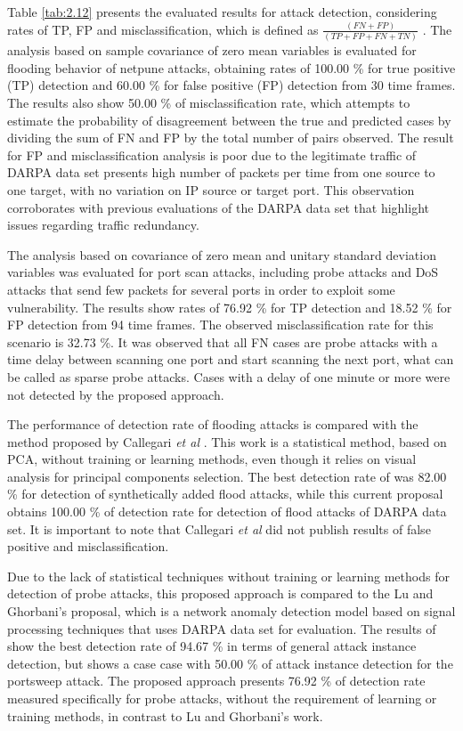 Table \ref{tab:2.12} presents the evaluated results for attack detection, considering rates of TP, FP \cite{fleiss2013statistical} and misclassification, which is defined as $\frac{(FN+FP)}{(TP+FP+FN+TN)}$ \cite{bhuyan2014network}. The analysis based on sample covariance of zero mean variables is evaluated for flooding behavior of netpune attacks, obtaining rates of 100.00 \% for true positive (TP) detection and 60.00 \% for false positive (FP) detection from 30 time frames. The results also show 50.00 \% of misclassification rate, which attempts to estimate the probability of disagreement between the true and predicted cases by dividing the sum of FN and FP by the total number of pairs observed. The result for FP and misclassification analysis is poor due to the legitimate traffic of DARPA data set presents high number of packets per time from one source to one target, with no variation on IP source or target port. This observation corroborates with previous evaluations of the DARPA data set that highlight issues regarding traffic redundancy. 

The analysis based on covariance of zero mean and unitary standard deviation variables was evaluated for port scan attacks, including probe attacks and DoS attacks that send few packets for several ports in order to exploit some vulnerability. The results show rates of 76.92 \% for TP detection and 18.52 \% for FP detection from 94 time frames. The observed misclassification rate for this scenario is 32.73 \%. It was observed that all FN cases are probe attacks with a time delay between scanning one port and start scanning the next port, what can be called as sparse probe attacks. Cases with a delay of one minute or more were not detected by the proposed approach.

The performance of detection rate of flooding attacks is compared with the method proposed by Callegari \emph{et al} \cite{Zonglin2009}. This work is a statistical method, based on PCA, without training or learning methods, even though it relies on visual analysis for principal components selection. The best detection rate of \cite{Zonglin2009} was 82.00 \% for detection of synthetically added flood attacks, while this current proposal obtains 100.00 \% of detection rate for detection of flood attacks of DARPA data set. It is important to note that Callegari \emph{et al} \cite{Zonglin2009} did not publish results of false positive and misclassification.

Due to the lack of statistical techniques without training or learning methods for detection of probe attacks, this proposed approach is compared to the Lu and Ghorbani's \cite{Lu2009} proposal, which is a network anomaly detection model based on signal processing techniques that uses DARPA data set for evaluation. The results of \cite{Lu2009} show the best detection rate of 94.67 \% in terms of general attack instance detection, but shows a case case with 50.00 \% of attack instance detection for the portsweep attack. The proposed approach presents 76.92 \% of detection rate measured specifically for probe attacks, without the requirement of learning or training methods, in contrast to Lu and Ghorbani's \cite{Lu2009} work.



